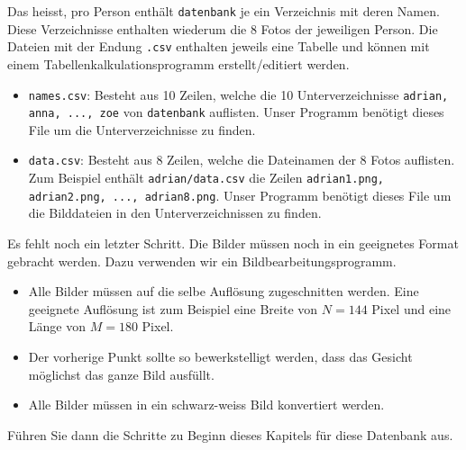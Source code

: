 Das heisst, pro Person enthält \texttt{datenbank} je ein Verzeichnis mit deren Namen.
Diese Verzeichnisse enthalten wiederum die 8 Fotos der jeweiligen Person.
Die Dateien mit der Endung \texttt{.csv} enthalten jeweils eine Tabelle und können mit einem Tabellenkalkulationsprogramm erstellt/editiert werden.
\begin{itemize}
	\item \texttt{names.csv}: Besteht aus 10 Zeilen, welche die 10 Unterverzeichnisse \texttt{adrian, anna, ..., zoe} von \texttt{datenbank} auflisten.
	Unser Programm benötigt dieses File um die Unterverzeichnisse zu finden.
	\item \texttt{data.csv}: Besteht aus 8 Zeilen, welche die Dateinamen der 8 Fotos auflisten.
	Zum Beispiel enthält \texttt{adrian/data.csv} die Zeilen \texttt{adrian1.png, adrian2.png, ..., adrian8.png}.
	Unser Programm benötigt dieses File um die Bilddateien in den Unterverzeichnissen zu finden.
\end{itemize}
Es fehlt noch ein letzter Schritt.
Die Bilder müssen noch in ein geeignetes Format gebracht werden.
Dazu verwenden wir ein Bildbearbeitungsprogramm.
\begin{itemize}
	\item Alle Bilder müssen auf die selbe Auflösung zugeschnitten werden.
	Eine geeignete Auflösung ist zum Beispiel eine Breite von $N=144$ Pixel und eine Länge von $M=180$ Pixel.
	\item Der vorherige Punkt sollte so bewerkstelligt werden, dass das Gesicht möglichst das ganze Bild ausfüllt.
	\item Alle Bilder müssen in ein schwarz-weiss Bild konvertiert werden.
\end{itemize}
Führen Sie dann die Schritte zu Beginn dieses Kapitels für diese Datenbank aus.